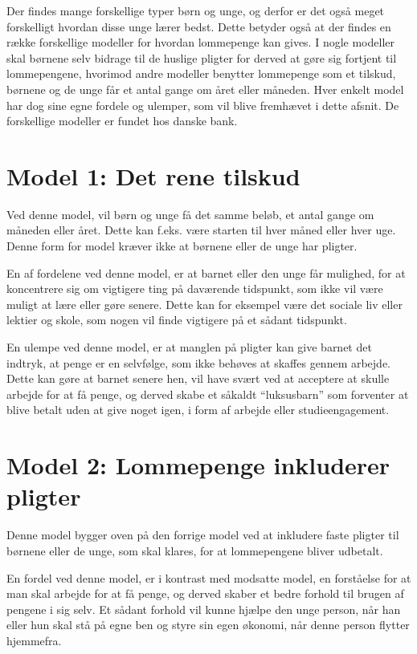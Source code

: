 Der findes mange forskellige typer børn og unge, 
og derfor er det også meget forskelligt hvordan 
disse unge lærer bedst. Dette betyder også at 
der findes en række forskellige modeller for 
hvordan lommepenge kan gives. I nogle modeller 
skal børnene selv bidrage til de huslige pligter 
for derved at gøre sig fortjent til 
lommepengene, hvorimod andre modeller benytter 
lommepenge som et tilskud, børnene og de unge 
får et antal gange om året eller måneden. Hver 
enkelt model har dog sine egne fordele og 
ulemper, som vil blive fremhævet i dette afsnit. 
De forskellige modeller er fundet hos danske 
bank.

\section{Model 1: Det rene tilskud}
Ved denne model, vil børn og unge få det samme 
beløb, et antal gange om måneden eller året. 
Dette kan f.eks. være starten til hver måned 
eller hver uge. Denne form for model kræver ikke 
at børnene eller de unge har pligter.

En af fordelene ved denne model, er at barnet 
eller den unge får mulighed, for at koncentrere 
sig om vigtigere ting på daværende tidspunkt, 
som ikke vil være muligt at lære eller gøre 
senere. Dette kan for eksempel være det sociale 
liv eller lektier og skole, som nogen vil finde 
vigtigere på et sådant tidspunkt.

En ulempe ved denne model, er at manglen på 
pligter kan give barnet det indtryk, at penge er 
en selvfølge, som ikke behøves at skaffes gennem 
arbejde. Dette kan gøre at barnet senere hen, 
vil have svært ved at acceptere at skulle 
arbejde for at få penge, og derved skabe et 
såkaldt “luksusbarn” som forventer at blive 
betalt uden at give noget igen, i form af 
arbejde eller studieengagement.

\section{Model 2: Lommepenge inkluderer 
pligter}
Denne model bygger oven på den forrige model ved 
at inkludere faste pligter til børnene eller de 
unge, som skal klares, for at lommepengene 
bliver udbetalt.

En fordel ved denne model, er i kontrast med 
modsatte model, en forståelse for at man skal 
arbejde for at få penge, og derved skaber et 
bedre forhold til brugen af pengene i sig selv. 
Et sådant forhold vil kunne hjælpe den unge 
person, når han eller hun skal stå på egne ben 
og styre sin egen økonomi, når denne person 
flytter hjemmefra.

